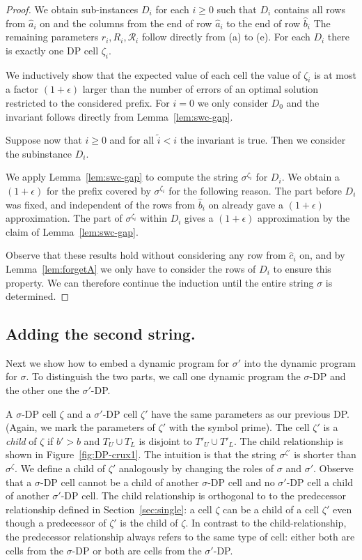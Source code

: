 \begin{proof}
    We obtain sub-instances $D_i$ for each $i \ge 0$ such that
    $D_i$ contains all rows from $\hat{a}_i$ on and the columns from the end of row $\hat{a}_i$ to the end of row $\hat{b}_i$
    The remaining parameters $r_i, R_i, \mathcal{R}_i$ follow directly from (a) to (e).
    For each $D_i$ there is exactly one DP cell $\zeta_i$.

    We inductively show that the expected value of each cell the value of $\zeta_i$ is at most a factor $(1+\epsilon)$ larger than the number of errors of an optimal solution restricted to the considered prefix.
    For $i=0$ we only consider $D_0$ and the invariant follows directly from Lemma~\ref{lem:swc-gap}.

    Suppose now that $i \ge 0$ and for all $\tilde{i}<i$ the invariant is true.
    Then we consider the subinstance $D_i$.

    We apply Lemma~\ref{lem:swc-gap} to compute the string $\sigma^{\zeta_i}$ for $D_i$.
    We obtain a $(1+\epsilon)$ for the prefix covered by $\sigma^{\zeta_i}$ for the following reason.
    The part before $D_i$ was fixed, and independent of the rows from $\hat{b}_i$ on already gave a $(1+\epsilon)$ approximation.
    The part of $\sigma^{\zeta_i}$ within $D_i$ gives a $(1+\epsilon)$ approximation by the claim of Lemma~\ref{lem:swc-gap}.
    
    Observe that these results hold without considering any row from $\hat{c}_i$ on, and by Lemma~\ref{lem:forgetA} we only have to consider the rows of $D_i$ to ensure this property.
    We can therefore continue the induction until the entire string $\sigma$ is determined.
\end{proof}

\subsection{Adding the second string.}\label{sec:second}
Next we show how to embed a dynamic program for $\sigma'$ into the dynamic program for $\sigma$.
To distinguish the two parts, we call one dynamic program the $\sigma$-DP and the other one the $\sigma'$-DP.

A $\sigma$-DP cell $\zeta$ and a $\sigma'$-DP cell $\zeta'$ have the same parameters as our previous DP. 
(Again, we mark the parameters of $\zeta'$ with the symbol prime). 
The cell $\zeta'$ is a \emph{child} of $\zeta$ if $b' > b$ and $T_U \cup T_L$ is disjoint to $T'_U \cup T'_L$. 
The child relationship is shown in Figure~\ref{fig:DP-crux1}.
The intuition is that the string $\sigma^{\zeta'}$ is shorter than $\sigma^\zeta$.
We define a child of $\zeta'$ analogously by changing the roles of $\sigma$ and $\sigma'$.
Observe that a $\sigma$-DP cell cannot be a child of another $\sigma$-DP cell and no $\sigma'$-DP cell a child of another $\sigma'$-DP cell.
The child relationship is orthogonal to to the predecessor relationship defined in Section~\ref{sec:single}: a cell $\zeta$ can be a child of a cell $\zeta'$ even though a predecessor of $\zeta'$ is the child of $\zeta$.
In contrast to the child-relationship, the predecessor relationship always refers to the same type of cell: either both are cells from the $\sigma$-DP or both are cells from the $\sigma'$-DP.

